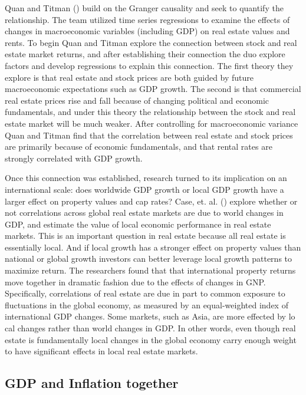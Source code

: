 \documentclass[jrfm,article,submit,oneauthor,pdftex]{Definitions/mdpi}
\begin{document}
Quan and Titman (\citeyear{quan1997commercial}) build on the Granger causality and seek to quantify the relationship. The team utilized time series regressions to examine the effects of changes in macroeconomic variables (including GDP) on real estate values and rents. To begin Quan and Titman explore the connection between stock and real estate market returns, and after establishing their connection the duo explore factors and develop regressions to explain this connection. The first theory they explore is that real estate and stock prices are both guided by future macroeconomic expectations such as GDP growth. The second is that commercial real estate prices rise and fall because of changing political and economic fundamentals, and under this theory the relationship between the stock and real estate market will be much weaker. After controlling for macroeconomic variance Quan and Titman find that the correlation between real estate and stock prices are primarily because of economic fundamentals, and that rental rates are strongly correlated with GDP growth.

Once this connection was established, research turned to its implication on an international scale: does worldwide GDP growth or local GDP growth have a larger effect on property values and cap rates? Case, et. al. (\citeyear{case2000global}) explore whether or not correlations across global real estate markets are due to world changes in GDP, and estimate the value of local economic performance in real estate markets. This is an important question in real estate because all real estate is essentially local. And if local growth has a stronger effect on property values than national or global growth investors can better leverage local growth patterns to maximize return. The researchers found that that international property returns move together in dramatic fashion due to the effects of changes in GNP. Specifically, correlations of real estate are due in part to common exposure to fluctuations in the global economy, as measured by an equal-weighted index of international GDP changes. Some markets, such as Asia, are more effected by lo cal changes rather than world changes in GDP. In other words, even though real estate is fundamentally local changes in the global economy carry enough weight to have significant effects in local real estate markets.

\subsection{GDP and Inflation together}
\end{document}
